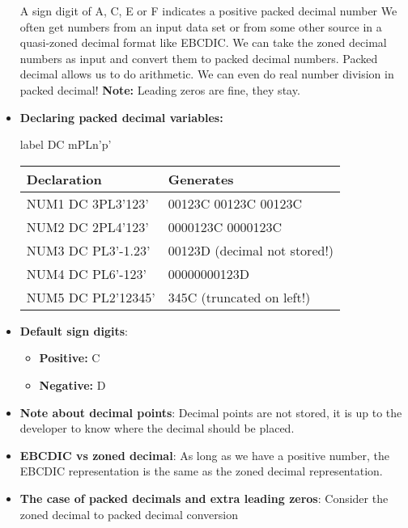 \documentclass{report}
\begin{document}
\begin{itemize}
            A sign digit of A, C, E or F indicates a positive packed decimal number
            \bigbreak \noindent 
            We often get numbers from an input data set or from some other source in a quasi-zoned decimal format like EBCDIC.
            \bigbreak \noindent 
            We can take the zoned decimal numbers as input and convert them to packed decimal numbers. Packed decimal allows us to do arithmetic. We can even do real number division in packed decimal!
            \bigbreak \noindent 
            \textbf{Note:} Leading zeros are fine, they stay.
        \item \textbf{Declaring packed decimal variables:}
            \bigbreak \noindent 
            \begin{cppcode}
            label DC mPLn'p'
            \end{cppcode}
            \bigbreak \noindent 
            \begin{center}
                \begin{tabular}{p{4cm}|p{7cm}}
                    Declaration &Generates \\
                    \hline
                    NUM1 DC 3PL3'123' &00123C 00123C 00123C \\
                    NUM2 DC 2PL4'123' &0000123C 0000123C \\
                    NUM3 DC PL3'-1.23' &00123D (decimal not stored!) \\
                    NUM4 DC PL6'-123' &00000000123D \\
                    NUM5 DC PL2'12345' &345C (truncated on left!) \\
                \end{tabular}
            \end{center}
        \item \textbf{Default sign digits}:
            \begin{itemize}
                \item \textbf{Positive:} C
                \item \textbf{Negative:} D
            \end{itemize}
        \item \textbf{Note about decimal points}: Decimal points are not stored, it is up to the developer to know where the decimal should be placed.
        \item \textbf{EBCDIC vs zoned decimal}: As long as we have a positive number, the EBCDIC representation is the same as the zoned decimal representation.
        \item \textbf{The case of packed decimals and extra leading zeros}: Consider the zoned decimal to packed decimal conversion

\end{itemize}
\end{document}
